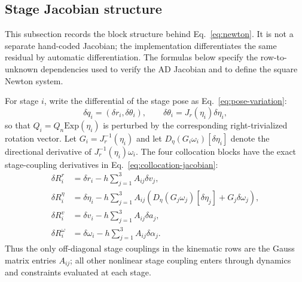 \documentclass[preprint,12pt]{elsarticle}
\begin{document}
\subsection{Stage Jacobian structure}

This subsection records the block structure behind
Eq.~\eqref{eq:newton}. It is not a separate hand-coded Jacobian; the
implementation differentiates the same residual by automatic differentiation.
The formulas below specify the row-to-unknown dependencies used to verify the
AD Jacobian and to define the square Newton system.

For stage $i$, write the differential of the stage pose as
Eq.~\eqref{eq:pose-variation}:
\begin{equation}
\label{eq:pose-variation}
  \delta q_i=(\delta r_i,\delta\theta_i),\qquad
  \delta\theta_i=J_r(\eta_i)\delta\eta_i ,
\end{equation}
so that $Q_i=Q_n\mathrm{Exp}(\eta_i)$ is perturbed by the corresponding
right-trivialized rotation vector. Let $G_i=J_r^{-1}(\eta_i)$ and let
$D_\eta(G_i\omega_i)[\delta\eta_i]$ denote the directional derivative of
$J_r^{-1}(\eta_i)\omega_i$. The four collocation blocks have the exact
stage-coupling derivatives in Eq.~\eqref{eq:collocation-jacobian}:
\begin{align}
  \delta R^r_i
    &= \delta r_i-h\sum_{j=1}^3 A_{ij}\delta v_j,\\
  \delta R^\eta_i
    &= \delta\eta_i-h\sum_{j=1}^3 A_{ij}
       \left(D_\eta(G_j\omega_j)[\delta\eta_j]
       +G_j\delta\omega_j\right),\\
  \delta R^v_i
    &= \delta v_i-h\sum_{j=1}^3 A_{ij}\delta a_j,\\
  \delta R^\omega_i
    &= \delta\omega_i-h\sum_{j=1}^3 A_{ij}\delta\alpha_j.
  \label{eq:collocation-jacobian}
\end{align}
Thus the only off-diagonal stage couplings in the kinematic rows are the
Gauss matrix entries $A_{ij}$; all other nonlinear stage coupling enters
through dynamics and constraints evaluated at each stage.
\end{document}
